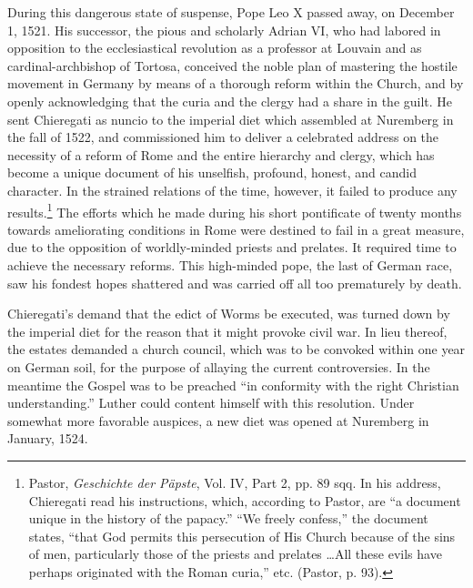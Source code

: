 During this dangerous state of suspense, Pope Leo X passed away,
on December 1, 1521. His successor, the pious and scholarly Adrian
VI, who had labored in opposition to the ecclesiastical revolution as
a professor at Louvain and as cardinal-archbishop of Tortosa, conceived
the noble plan of mastering the hostile movement in Germany
by means of a thorough reform within the Church, and by openly
acknowledging that the curia and the clergy had a share in the guilt.
He sent Chieregati as nuncio to the imperial diet which assembled at
Nuremberg in the fall of 1522, and commissioned him to deliver
a celebrated address on the necessity of a reform of Rome and the
entire hierarchy and clergy, which has become a unique document of
his unselfish, profound, honest, and candid character. In the strained
relations of the time, however, it failed to produce any results.\footnote
{Pastor, \textit{Geschichte der Päpste}, Vol. IV, Part 2, pp. 89 sqq. In his address, Chieregati
read his instructions, which, according to Pastor, are “a document unique in the history
of the papacy.” “We freely confess,” the document states, “that God permits this persecution
of His Church because of the sins of men, particularly those of the priests and prelates
\dots All these evils have perhaps originated with the Roman curia,” etc. (Pastor,
p. 93).}
The efforts which he made during his short pontificate of twenty months
towards ameliorating conditions in Rome were destined to fail in a
great measure, due to the opposition of worldly-minded priests and
prelates. It required time to achieve the necessary reforms. This high-minded
pope, the last of German race, saw his fondest hopes shattered
and was carried off all too prematurely by death.

Chieregati’s demand that the edict of Worms be executed, was
turned down by the imperial diet for the reason that it might provoke civil
war. In lieu thereof, the estates demanded a church council,
which was to be convoked within one year on German soil, for the
purpose of allaying the current controversies. In the meantime the
Gospel was to be preached “in conformity with the right Christian
understanding.” Luther could content himself with this resolution.
Under somewhat more favorable auspices, a new diet was opened
at Nuremberg in January, 1524.


